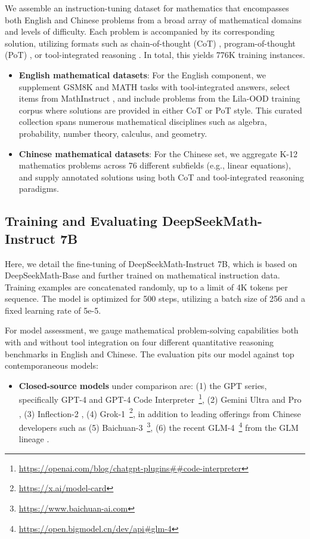 \begin{itemize}[topsep=0pt]
We assemble an instruction-tuning dataset for mathematics that encompasses both English and Chinese problems from a broad array of mathematical domains and levels of difficulty. Each problem is accompanied by its corresponding solution, utilizing formats such as chain-of-thought (CoT) \citep{cot}, program-of-thought (PoT) \citep{pot,pal}, or tool-integrated reasoning \citep{tora}. In total, this yields 776K training instances.

\begin{itemize}[topsep=0pt]
    \item \textbf{English mathematical datasets}: For the English component, we supplement GSM8K and MATH tasks with tool-integrated answers, select items from MathInstruct \citep{MathInstruct}, and include problems from the Lila-OOD \citep{lila} training corpus where solutions are provided in either CoT or PoT style. This curated collection spans numerous mathematical disciplines such as algebra, probability, number theory, calculus, and geometry.
    \item \textbf{Chinese mathematical datasets}: For the Chinese set, we aggregate K-12 mathematics problems across 76 different subfields (e.g., linear equations), and supply annotated solutions using both CoT and tool-integrated reasoning paradigms.
\end{itemize}

\subsection{Training and Evaluating DeepSeekMath-Instruct 7B}

Here, we detail the fine-tuning of DeepSeekMath-Instruct 7B, which is based on DeepSeekMath-Base and further trained on mathematical instruction data. Training examples are concatenated randomly, up to a limit of 4K tokens per sequence. The model is optimized for 500 steps, utilizing a batch size of 256 and a fixed learning rate of 5e-5.

For model assessment, we gauge mathematical problem-solving capabilities both with and without tool integration on four different quantitative reasoning benchmarks in English and Chinese. The evaluation pits our model against top contemporaneous models:

\begin{itemize}[topsep=0pt]
    \item \textbf{Closed-source models} under comparison are: (1) the GPT series, specifically GPT-4 \citep{gpt4} and GPT-4 Code Interpreter~\footnote{\url{https://openai.com/blog/chatgpt-plugins\#\#code-interpreter}}, (2) Gemini Ultra and Pro \citep{gemini}, (3) Inflection-2 \citep{inflection-2}, (4) Grok-1~\footnote{\url{https://x.ai/model-card}}, in addition to leading offerings from Chinese developers such as (5) Baichuan-3~\footnote{\url{https://www.baichuan-ai.com}}, (6) the recent GLM-4~\footnote{\url{https://open.bigmodel.cn/dev/api\#glm-4}} from the GLM lineage \citep{glm}.
\end{itemize}


\end{itemize}
